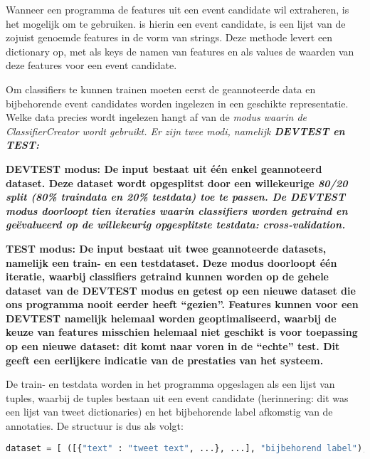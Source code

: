 {{Wanneer een programma de features uit een event candidate wil extraheren, is het 
mogelijk om  te gebruiken.  is hierin 
een event candidate,  is een lijst van de zojuist genoemde features in 
de vorm van strings. Deze methode levert een dictionary op, met als keys de namen 
van features en als values de waarden van deze features voor een event 
candidate.

\label{ClassifierCreator}

Om classifiers te kunnen trainen moeten eerst de geannoteerde data en 
bijbehorende event candidates worden ingelezen in een geschikte representatie. 
Welke data precies wordt ingelezen hangt af van de \it{modus} waarin de 
ClassifierCreator wordt gebruikt. Er zijn twee modi, namelijk \bf{DEVTEST} en \bf{TEST}:

\begin{bullets}
\item \bf{DEVTEST modus}: De input bestaat uit één enkel geannoteerd dataset. Deze 
dataset wordt opgesplitst door een willekeurige \it{80/20 split} (80\% traindata en 
20\% testdata) toe te passen. De DEVTEST modus doorloopt tien iteraties waarin 
classifiers worden getraind en geëvalueerd op de willekeurig opgesplitste testdata: \it{cross-validation}.

\item \bf{TEST modus}: De input bestaat uit twee geannoteerde datasets, namelijk een 
train- en een testdataset. Deze modus doorloopt één iteratie, waarbij 
classifiers getraind kunnen worden op de gehele dataset van de DEVTEST modus en 
getest op een nieuwe dataset die ons programma nooit eerder heeft “gezien”. 
Features kunnen voor een DEVTEST namelijk helemaal worden geoptimaliseerd, 
waarbij de keuze van features misschien helemaal niet geschikt is voor 
toepassing op een nieuwe dataset: dit komt naar voren in de “echte” test. Dit 
geeft een eerlijkere indicatie van de prestaties van het systeem.
\end{bullets}

De train- en testdata worden in het programma opgeslagen als een lijst van 
tuples, waarbij de tuples bestaan uit een event candidate (herinnering: dit was 
een lijst van tweet dictionaries) en het bijbehorende label afkomstig van de 
annotaties. De structuur is dus als volgt:

\begin{lstlisting}[language=Python]
dataset = [ ([{"text" : "tweet text", ...}, ...], "bijbehorend label"), ...]
\end{lstlisting}

}}
